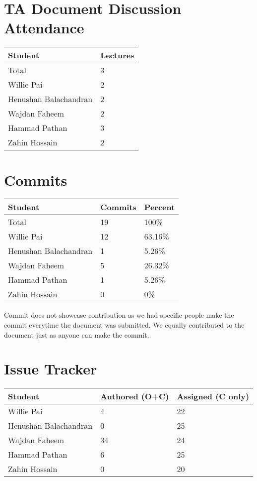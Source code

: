 \documentclass{article}
\begin{document}
\section{TA Document Discussion Attendance}

\begin{table}[H]
\centering
\begin{tabular}{ll}
\toprule
\textbf{Student} & \textbf{Lectures}\\
\midrule
Total & 3\\
Willie Pai & 2\\
Henushan Balachandran & 2\\
Wajdan Faheem & 2\\
Hammad Pathan & 3\\
Zahin Hossain & 2\\
\bottomrule
\end{tabular}
\end{table}

\section{Commits}

\begin{table}[H]
\centering
\begin{tabular}{lll}
\toprule
\textbf{Student} & \textbf{Commits} & \textbf{Percent}\\
\midrule
Total & 19 & 100\% \\
Willie Pai & 12 & 63.16\% \\
Henushan Balachandran & 1 & 5.26\% \\
Wajdan Faheem & 5 & 26.32\% \\
Hammad Pathan & 1 & 5.26\% \\
Zahin Hossain & 0 & 0\% \\
\bottomrule
\end{tabular}
\end{table}

Commit does not showcase contribution as we had specific people make the commit everytime the document was submitted. We equally contributed to the document just as anyone can make the commit.

\section{Issue Tracker}


\begin{table}[H]
\centering
\begin{tabular}{lll}
\toprule
\textbf{Student} & \textbf{Authored (O+C)} & \textbf{Assigned (C only)}\\
\midrule
Willie Pai & 4 & 22 \\
Henushan Balachandran & 0 & 25 \\
Wajdan Faheem & 34 & 24 \\
Hammad Pathan & 6 & 25 \\
Zahin Hossain & 0 & 20 \\
\bottomrule
\end{tabular}
\end{table}
\end{document}
